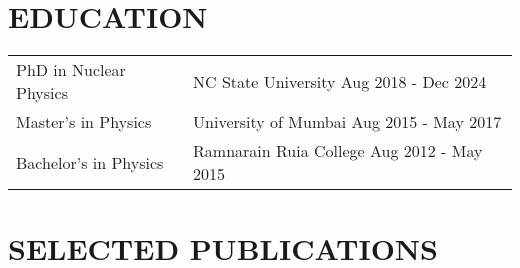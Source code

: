 \documentclass[a4paper,12pt]{article}
\begin{document}
\section{\textbf{EDUCATION}}
\begin{tabularx}{\linewidth}{@{}l X@{}}	
PhD in Nuclear Physics & NC State University \hfill Aug 2018 - Dec 2024 \\
Master's in Physics & University of Mumbai \hfill Aug 2015 - May 2017 \\ 
Bachelor's in Physics & Ramnarain Ruia College \hfill  Aug 2012 - May 2015 \\
\end{tabularx}

\section{\textbf{SELECTED PUBLICATIONS}}
\begin{refsection}
\nocite{*}
\printbibliography[heading=none]
\end{refsection}
\vfill
\end{document}
